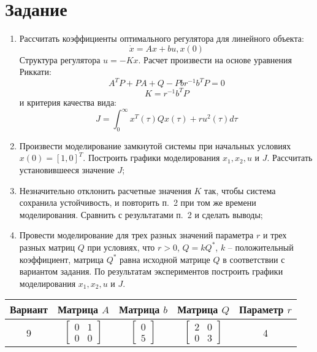 \documentclass[14pt, a4paper]{extarticle}
\begin{document}
	\onehalfspacing
	
	\setcounter{page}{2}
	
	\section*{Задание}
	
	\begin{enumerate}
		\item Рассчитать коэффициенты оптимального регулятора для линейного объекта:
		$$\dot{x}=Ax+bu, x(0)$$
		Структура регулятора $u=-Kx$. Расчет произвести на основе уравнения Риккати:
		$$A^TP+PA+Q-Pbr^{-1}b^TP=0$$
		$$K=r^{-1}b^TP$$
		и критерия качества вида:
		$$J=\int_{0}^{\infty}x^T(\tau)Qx(\tau)+ru^2(\tau)d\tau$$
		\item Произвести моделирование замкнутой системы при начальных условиях $x(0)=[1,0]^T$. Построить графики моделирования $x_1,x_2,u$ и $J$. Рассчитать установившееся значение $J$;
		\item Незначительно отклонить расчетные значения $K$ так, чтобы система сохранила устойчивость, и повторить п.~2 при том же времени моделирования. Сравнить с результатами п.~2 и сделать выводы;
		\item Провести моделирование для трех разных значений параметра $r$ и трех разных матриц $Q$ при условиях, что $r>0$, $Q=kQ^*$, $k$ -- положительный коэффициент, матрица $Q^*$ равна исходной матрице $Q$ в соответствии с вариантом задания. По результатам экспериментов построить графики моделирования $x_1,x_2,u$ и $J$.
	\end{enumerate}
	\begin{table}[h]
		\centering
		\begin{tabular}{|c|c|c|c|c|}
			\hline
			Вариант & Матрица $A$ & Матрица $b$ & Матрица $Q$ & Параметр $r$ \\\hline
			9 & 
			$\left[
			\begin{matrix}
				0 & 1 \\
				0 & 0 
			\end{matrix}
			\right]$
			& 
			$\left[
			\begin{matrix}
				0 \\ 5
			\end{matrix}
			\right]$
			& 
			$\left[
			\begin{matrix}
				2 & 0 \\
				0 & 3 
			\end{matrix}
			\right]$
			& 4 \\\hline
		\end{tabular}
	\end{table}
\end{document}
